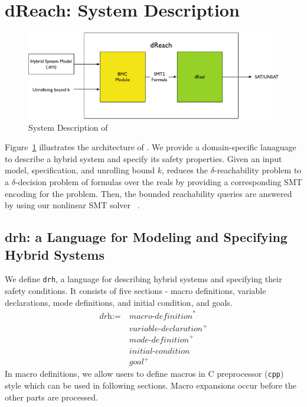 \section{dReach: System Description}
\begin{figure}
  \centering
  \includegraphics[width=\textwidth]{images/dReach}
  \caption{System Description of \dReach{}}
  \label{fig:system-description}
\end{figure}

Figure~\ref{fig:system-description} illustrates the architecture of
\dReach{}. We provide a domain-specific lanaguage to describe a hybrid
system and specify its safety properties. Given an input model,
specification, and unrolling bound $k$, \dReach{} reduces the
$\delta$-reachability problem to a $\delta$-decision problem of
formulas over the reals by providing a corresponding SMT encoding for
the problem. Then, the bounded reachability queries are answered by
using our nonlinear SMT solver \dReal{}~\cite{DBLP:conf/cade/GaoKC13}.

\subsection{drh: a Language for Modeling and Specifying Hybrid Systems}

We define \texttt{drh}, a language for describing hybrid systems and
specifying their safety conditions. It consists of five sections -
macro definitions, variable declarations, mode definitions, and
initial condition, and goals.
\begin{align*}
  \textit{drh} := \ & \textit{macro-definition}^*\\
                    & \textit{variable-declaration}^+\\
                    & \textit{mode-definition}^+\\
                    & \textit{initial-condition}\\
                    & \textit{goal}^+
\end{align*}
In macro definitions, we allow users to define macros in
C preprocessor (\texttt{cpp}) style which can be used in following
sections. Macro expansions occur before the other parts are processed.

